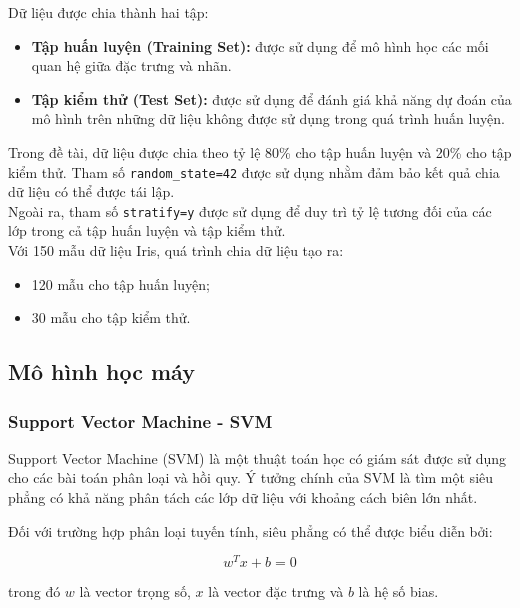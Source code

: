 \documentclass[14pt]{extarticle}
\begin{document}
		 \noindent Dữ liệu được chia thành hai tập:
		 
		 \begin{itemize}
		 	\item \textbf{Tập huấn luyện (Training Set):} được sử dụng để mô hình
		 	học các mối quan hệ giữa đặc trưng và nhãn.
		 	
		 	\item \textbf{Tập kiểm thử (Test Set):} được sử dụng để đánh giá khả năng
		 	dự đoán của mô hình trên những dữ liệu không được sử dụng trong quá trình
		 	huấn luyện.
		 \end{itemize}
		 
		\noindent Trong đề tài, dữ liệu được chia theo tỷ lệ 80\% cho tập huấn luyện và 20\% cho tập kiểm thử. Tham số \texttt{random\_state=42} được sử dụng nhằm đảm bảo kết quả chia dữ liệu có thể được tái lập.\\
		 
		 \noindent Ngoài ra, tham số \texttt{stratify=y} được sử dụng để duy trì tỷ lệ tương đối của các lớp trong cả tập huấn luyện và tập kiểm thử.\\
		 
		 \noindent Với 150 mẫu dữ liệu Iris, quá trình chia dữ liệu tạo ra:
		 \vspace{-0.5em}
		 \begin{itemize}
		 	\item 120 mẫu cho tập huấn luyện;
		 	\item 30 mẫu cho tập kiểm thử.
		 \end{itemize}
		 \subsection{Mô hình học máy}
		 \subsubsection{Support Vector Machine - SVM }
			\noindent  Support Vector Machine (SVM) là một thuật toán học có giám sát được sử dụng cho các bài toán phân loại và hồi quy. Ý tưởng chính của SVM là tìm một siêu phẳng có khả năng phân tách các lớp dữ liệu với khoảng cách biên lớn nhất.
		 
		 	\noindent  Đối với trường hợp phân loại tuyến tính, siêu phẳng có thể được biểu diễn bởi:
		 
		 \begin{equation*}
		 	w^T x + b = 0
		 \end{equation*}
		 
		 	\noindent trong đó $w$ là vector trọng số, $x$ là vector đặc trưng và $b$ là hệ số
		 bias.
		 
\end{document}
